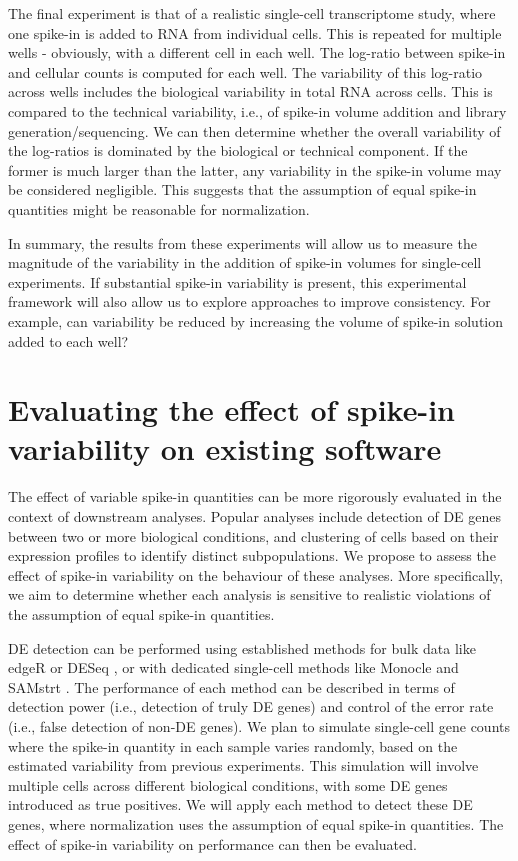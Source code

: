 \documentclass{article}
\begin{document}
The final experiment is that of a realistic single-cell transcriptome study, where one spike-in is added to RNA from individual cells.
This is repeated for multiple wells - obviously, with a different cell in each well.
The log-ratio between spike-in and cellular counts is computed for each well.
The variability of this log-ratio across wells includes the biological variability in total RNA across cells.
This is compared to the technical variability, i.e., of spike-in volume addition and library generation/sequencing.
We can then determine whether the overall variability of the log-ratios is dominated by the biological or technical component.
If the former is much larger than the latter, any variability in the spike-in volume may be considered negligible.
This suggests that the assumption of equal spike-in quantities might be reasonable for normalization.

In summary, the results from these experiments will allow us to measure the magnitude of the variability in the addition of spike-in volumes for single-cell experiments.
If substantial spike-in variability is present, this experimental framework will also allow us to explore approaches to improve consistency.
For example, can variability be reduced by increasing the volume of spike-in solution added to each well?

\section{Evaluating the effect of spike-in variability on existing software}
The effect of variable spike-in quantities can be more rigorously evaluated in the context of downstream analyses.
Popular analyses include detection of DE genes between two or more biological conditions, and clustering of cells based on their expression profiles to identify distinct subpopulations.
We propose to assess the effect of spike-in variability on the behaviour of these analyses.
More specifically, we aim to determine whether each analysis is sensitive to realistic violations of the assumption of equal spike-in quantities.

DE detection can be performed using established methods for bulk data like edgeR \cite{robinson2010edgeR} or DESeq \cite{anders2010differential}, or with dedicated single-cell methods like Monocle \cite{trapnell2014dynamics} and SAMstrt \cite{katayama2013samstrt}.
The performance of each method can be described in terms of detection power (i.e., detection of truly DE genes) and control of the error rate (i.e., false detection of non-DE genes).
We plan to simulate single-cell gene counts where the spike-in quantity in each sample varies randomly, based on the estimated variability from previous experiments.
This simulation will involve multiple cells across different biological conditions, with some DE genes introduced as true positives.
We will apply each method to detect these DE genes, where normalization uses the assumption of equal spike-in quantities.
The effect of spike-in variability on performance can then be evaluated.
\end{document}
